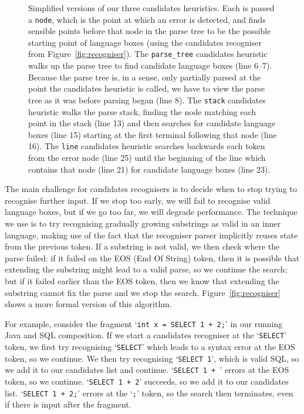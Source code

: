 \documentclass[sigplan,screen]{acmart}
\begin{document}
\begin{figure}[t]
  \caption{Simplified versions of our three candidates heuristics. Each is
  passed a \texttt{node}, which is the point at which an error is detected, and
finds sensible points before that node in the parse tree to be the possible
starting point of language boxes (using the candidates recogniser from
Figure~\ref{fig:recogniser}).
The \texttt{parse\_tree} candidates heuristic
walks up the parse tree to find candidate language boxes (line 6--7).
Because the parse tree is, in a sense, only partially parsed at the point the
candidates heuristic is called, we have to view the parse tree as it was before parsing
began (line 8).
The \texttt{stack} candidates heuristic walks the parse
stack, finding the node matching each point in the stack (line 13) and then
searches for candidate language boxes (line 15) starting at the first terminal
following that node (line 16).
The \texttt{line} candidates heuristic searches
backwards each token from the error node (line 25) until the beginning of
the line which contains that node (line 21) for
candidate language boxes (line 23).}
\label{lst:find_candidates}
\end{figure}

The main challenge for candidates recognisers is to decide when to stop trying to recognise
further input. If we stop too early, we will fail to recognise valid language
boxes, but if we go too far, we will degrade performance. The technique
we use is to try recognising gradually growing substrings as valid in an inner
language, making use of the fact that the recogniser parser implicitly
reuses state from the previous token.
If a substring is not valid, we then check where the parse failed:
if it failed on the EOS (End Of String) token, then it is possible that
extending the substring might lead to a valid parse, so we continue the search; but if it
failed earlier than the EOS token, then we know that extending the substring
cannot fix the parse and we stop the search. Figure~\ref{fig:recogniser} shows a
more formal version of this algorithm.


For example, consider the fragment `\texttt{int x = SELECT 1 + 2;}' in our
running Java and SQL composition. If we start a candidates recogniser at the
`\texttt{SELECT}' token, we first try recognising `\texttt{SELECT}' which leads
to a syntax error at the EOS token, so we continue. We then try recognising
`\texttt{SELECT 1}', which is valid SQL, so we add it to our candidates list
and continue. `\texttt{SELECT 1 + }' errors at the EOS token, so we continue.
`\texttt{SELECT 1 + 2}' succeeds, so we add it to our candidates list.
`\texttt{SELECT 1 + 2;}' errors at the `\texttt{;}' token, so the search then
terminates, even if there is input after the fragment.
\end{document}
